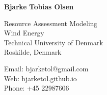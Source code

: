 \documentclass[12pt,letterpaper]{report}
\newcommand{\myname}{Bjarke Tobias Olsen}
\newcommand{\namefont}[1]{{\normalfont\bfseries\Huge{#1}}}
\begin{document}
\raggedright

\namefont{\myname}

\vspace{1em}
\begin{minipage}[t]{0.495\textwidth}
  Resource Assessment Modeling \\
  Wind Energy \\
  Technical University of Denmark \\
  Roskilde, Denmark
\end{minipage}
\begin{minipage}[t]{0.495\textwidth}
  Email: bjarketol@gmail.com \\
  Web: bjarketol.github.io \\
  Phone: +45 22987606
\end{minipage}
\vspace{0.5em}












\end{document}
